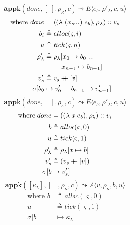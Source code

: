 \documentclass[12pt,draft]{article}
\newcommand\mdoubleplus{\ensuremath{\mathbin{+\mkern-9mu+}}}
\newcommand{\lamsyn}[2]{(\lambda\;(#1 ...)\;#2)}
\newcommand{\vararglamsyn}[2]{(\lambda\;#1\;#2)}
\begin{document}
\begin{multicols*}{2}
\vfill\null
\columnbreak


\[
\textbf{appk}(done, [\;], \rho_{\kappa}, c)
\leadsto
E\langle
e_b , \rho'_{\lambda} , c , u
\rangle
\]
\vspace{-11mm}
\begin{align*}
\text{where } done &= (\lamsyn{x_s}{e_b}, \rho_{\lambda}) :: v_s \\
b_i &\triangleq alloc(\varsigma, i) \\
u &\triangleq tick(\varsigma, n) \\
\rho'_{\lambda} &\triangleq \rho_{\lambda}[x_0 \mapsto b_0 \;... \\
&\;\;\;\;\;\;\;\;\;x_{n-1} \mapsto b_{n-1}] \\
v'_s &\triangleq v_s \mdoubleplus [v] \\
\sigma[b_0 &\mapsto v'_0 \;...\; b_{n-1} \mapsto v'_{n-1}]
\end{align*}
\[
\textbf{appk}(done, [\;], \rho_{\kappa}, c)
\leadsto
E\langle
e_b , \rho'_{\lambda} , c , u
\rangle
\]
\vspace{-9mm}
\begin{align*}
\text{where } done &= (\vararglamsyn{x}{e_b}, \rho_{\lambda}) :: v_s \\
b &\triangleq alloc(\varsigma, 0) \\
u &\triangleq tick(\varsigma, 1) \\
\rho'_{\lambda} &\triangleq \rho_{\lambda}[x \mapsto b] \\
v'_s &\triangleq (v_s \mdoubleplus [v]) \\
\sigma[b &\mapsto v'_s]
\end{align*}
\[
\textbf{appk}([\kappa_{\lambda}], [\;], \rho_{\kappa}, c)
\leadsto
A\langle
v , \rho_{\kappa} , b , u
\rangle
\]
\vspace{-10mm}
\begin{align*}
\text{where } b &\triangleq alloc(\varsigma, 0) \\
u &\triangleq tick(\varsigma, 1) \\
\sigma[b &\mapsto \kappa_{\lambda}]
\end{align*}

\end{multicols*}
\end{document}
